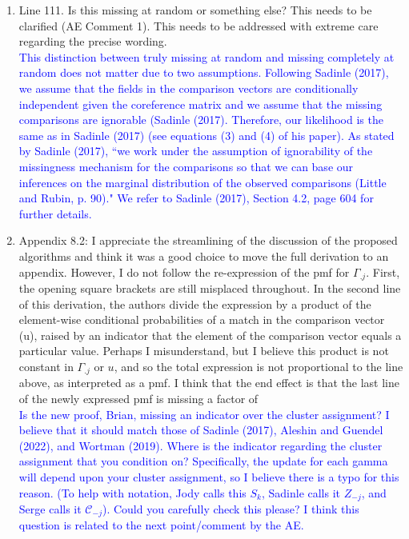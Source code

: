 \documentclass{article}
\newcommand{\C}{\mathcal{C}}
\begin{document}
\begin{enumerate}
\item Line 111. Is this missing at random or something else? This needs to be clarified (AE Comment 1). This needs to be addressed with extreme care regarding the precise wording. \\
\textcolor{blue}{This distinction between truly missing at random and missing completely at random does not matter due to two assumptions. Following Sadinle (2017), we assume that the fields in the comparison vectors are conditionally independent given the coreference matrix and we assume that the missing comparisons are ignorable (Sadinle (2017). Therefore, our likelihood is the same as in Sadinle (2017) (see equations (3) and (4) of his paper). As stated by Sadinle (2017), ``we work under the assumption of ignorability of the missingness mechanism for the comparisons so that we can base our inferences on the marginal distribution of the observed comparisons (Little and Rubin, p. 90)."  We refer to Sadinle (2017), Section 4.2, page 604 for further details.}
\item Appendix 8.2: I appreciate the streamlining of the discussion of the proposed algorithms and
	think it was a good choice to move the full derivation to an appendix. However, I do not follow
	the re-expression of the pmf for $\Gamma_{.j}$. First, the opening square brackets are still misplaced
	throughout. In the second line of this derivation, the authors divide the expression by a product
	of the element-wise conditional probabilities of a match in the comparison vector (u), raised by
	an indicator that the element of the comparison vector equals a particular value. Perhaps I
	misunderstand, but I believe this product is not constant in $\Gamma_{.j}$ or $u$, and so the total expression
	is not proportional to the line above, as interpreted as a pmf. I think that the end effect is that
	the last line of the newly expressed pmf is missing a factor of \\
	\textcolor{blue}{Is the new proof, Brian, missing an indicator over the cluster assignment? I believe that it should match those 
	of Sadinle (2017), Aleshin and Guendel (2022), and Wortman (2019). Where is the indicator regarding the cluster assignment that you condition on? Specifically, the update for each gamma will depend upon your cluster assignment, so I believe there is a typo for this reason. (To help with notation,  Jody calls this $S_k$, Sadinle calls it $Z_{-j}$, and Serge calls it $\C_{-j}$). Could you carefully check this please? I think this question is related to the next point/comment by the AE.}

\end{enumerate}
\end{document}
